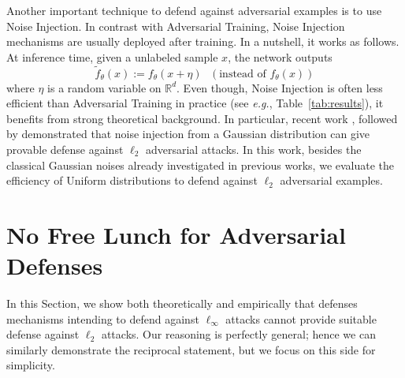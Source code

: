Another important technique to defend against adversarial examples is to use Noise Injection. 
In contrast with Adversarial Training, Noise Injection mechanisms are usually deployed after training. In a nutshell, it works as follows. At inference time, given a unlabeled sample $x$, the network outputs
\begin{equation}
    \tilde{f}_\theta (x):= f_\theta(x + \eta) \ \ \ (\text{instead of  }f_\theta(x)) 
\end{equation}
where $\eta$ is a random variable on $\mathbb{R}^d$.
Even though, Noise Injection is often less efficient than Adversarial Training in practice (see \emph{e.g.}, Table~\ref{tab:results}), it benefits from strong theoretical background. In particular, recent work \cite{lecuyer2018certified}, followed by \cite{KolterRandomizedSmoothing,pinot2019theoretical} demonstrated that noise injection from a Gaussian distribution can give provable defense against $\ell_2$ adversarial attacks. In this work, besides the classical Gaussian noises already investigated in previous works, we evaluate the efficiency of Uniform distributions to defend against $\ell_2$ adversarial examples. 


\section{No Free Lunch for Adversarial Defenses}
\label{sec:no_free_lunch}

In this Section, we show both theoretically and empirically that defenses mechanisms intending to defend against $\ell_\infty$ attacks cannot provide suitable defense against $\ell_2$ attacks. Our reasoning is perfectly general; hence we can similarly demonstrate the reciprocal statement, but we focus on this side for simplicity. 

